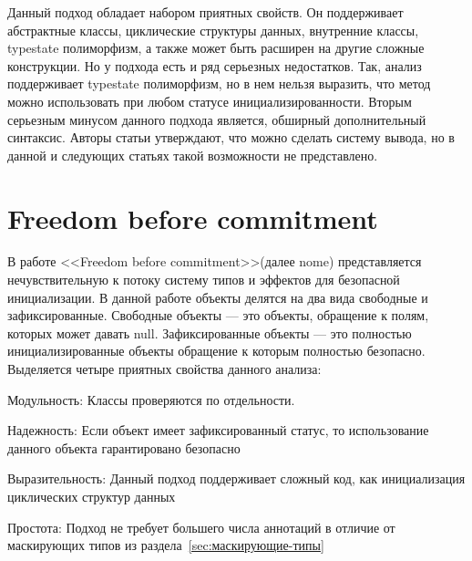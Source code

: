 Данный подход обладает набором приятных свойств.
Он поддерживает абстрактные классы, циклические структуры данных, внутренние классы, typestate полиморфизм,
а также может быть расширен на другие сложные конструкции.
Но у подхода есть и ряд серьезных недостатков.
Так, анализ поддерживает typestate полиморфизм, но в нем нельзя выразить,
что метод можно использовать при любом статусе инициализированности.
Вторым серьезным минусом данного подхода является, обширный дополнительный синтаксис.
Авторы статьи утверждают, что можно сделать систему вывода, но в данной и следующих статьях такой возможности не представлено.


\section{Freedom before commitment}\label{sec:the-freedom-model}

В работе <<Freedom before commitment>>(далее nome)\cite{the-freedom-model} представляется нечувствительную к потоку
систему типов и эффектов для безопасной инициализации.
В данной работе объекты делятся на два вида свободные и зафиксированные.
Свободные объекты --- это объекты, обращение к полям, которых может давать null.
Зафиксированные объекты --- это полностью инициализированные объекты обращение к которым полностью безопасно.
Выделяется четыре приятных свойства данного анализа:
\begin{itemize*}
    \item Модульность: Классы проверяются по отдельности.
    \item Надежность: Если объект имеет зафиксированный статус, то использование данного объекта гарантировано безопасно
    \item Выразительность: Данный подход поддерживает сложный код, как инициализация циклических структур данных
    \item Простота: Подход не требует большего числа аннотаций в отличие от маскирующих типов из раздела~\ref{sec:маскирующие-типы}
\end{itemize*}

